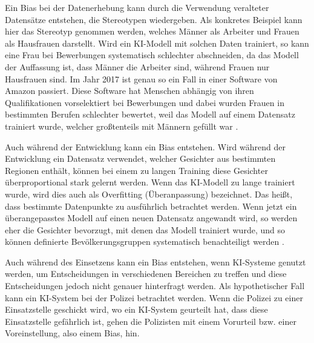 \documentclass[11pt]{article}
\begin{document}
Ein Bias bei der Datenerhebung kann durch die Verwendung veralteter Datensätze entstehen, die Stereotypen wiedergeben. Als konkretes Beispiel kann hier das Stereotyp genommen werden, welches Männer als Arbeiter und Frauen als Hausfrauen darstellt. Wird ein KI-Modell mit solchen Daten trainiert, so kann eine Frau bei Bewerbungen systematisch schlechter abschneiden, da das Modell der Auffassung ist, dass Männer die Arbeiter sind, während Frauen nur Hausfrauen sind. Im Jahr 2017 ist genau so ein Fall in einer Software von Amazon passiert. Diese Software hat Menschen abhängig von ihren Qualifikationen vorselektiert bei Bewerbungen und dabei wurden Frauen in bestimmten Berufen schlechter bewertet, weil das Modell auf einem Datensatz trainiert wurde, welcher großtenteils mit Männern gefüllt war \cite{dastin_insight_2018, Bias}.  

Auch während der Entwicklung kann ein Bias entstehen. Wird während der Entwicklung ein Datensatz verwendet, welcher Gesichter aus bestimmten Regionen enthält, können bei einem zu langen Training diese Gesichter überproportional stark gelernt werden. Wenn das KI-Modell zu lange trainiert wurde, wird dies auch als Overfitting (Überanpassung) bezeichnet. Das heißt, dass bestimmte Datenpunkte zu ausführlich betrachtet werden. Wenn jetzt ein überangepasstes Modell auf einen neuen Datensatz angewandt wird, so werden eher die Gesichter bevorzugt, mit denen das Modell trainiert wurde, und so können definierte Bevölkerungsgruppen systematisch benachteiligt werden \cite{Bias}. 

Auch während des Einsetzens kann ein Bias entstehen, wenn KI-Systeme genutzt werden, um Entscheidungen in verschiedenen Bereichen zu treffen und diese Entscheidungen jedoch nicht genauer hinterfragt werden. Als hypothetischer Fall kann ein KI-System bei der Polizei betrachtet werden. Wenn die Polizei zu einer Einsatzstelle geschickt wird, wo ein KI-System geurteilt hat, dass diese Einsatzstelle gefährlich ist, gehen die Polizisten mit einem Vorurteil bzw. einer Voreinstellung, also einem Bias, hin\cite{Bias}.
\end{document}
